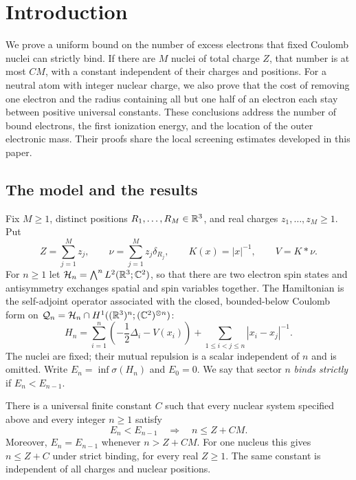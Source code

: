 \section{Introduction}\label{sec:introduction}

We prove a uniform bound on the number of excess electrons that fixed
Coulomb nuclei can strictly bind. If there are $M$ nuclei of total charge
$Z$, that number is at most $CM$, with a constant independent of their
charges and positions. For a neutral atom with integer nuclear charge, we
also prove that the cost of removing one electron and the radius containing
all but one half of an electron each stay between positive universal
constants. These conclusions address the number of bound electrons, the
first ionization energy, and the location of the outer electronic mass.
Their proofs share the local screening estimates developed in this paper.

\subsection{The model and the results}

Fix $M\ge1$, distinct positions $R_1,\ldots,R_M\in\mathbb R^3$, and real
charges $z_1,\ldots,z_M\ge1$. Put
\[
 Z=\sum_{j=1}^M z_j,\qquad \nu=\sum_{j=1}^M z_j\delta_{R_j},
 \qquad K(x)=|x|^{-1},\qquad V=K*\nu.
\]
For $n\ge1$ let $\mathcal H_n=\bigwedge^nL^2(\mathbb R^3;\mathbb C^2)$, so that
there are two electron spin states and antisymmetry exchanges spatial and
spin variables together. The Hamiltonian is the self-adjoint operator
associated with the closed, bounded-below Coulomb form on
$\mathcal Q_n=\mathcal H_n\cap H^1((\mathbb R^3)^n;(\mathbb C^2)^{\otimes n})$:
\begin{equation}\label{eq:hamiltonian}
 H_n=\sum_{i=1}^n\left(-\frac12\Delta_i-V(x_i)\right)
       +\sum_{1\le i<j\le n}|x_i-x_j|^{-1}.
\end{equation}
The nuclei are fixed; their mutual repulsion is a scalar independent of
$n$ and is omitted. Write $E_n=\inf\sigma(H_n)$ and $E_0=0$.
We say that sector $n$ \emph{binds strictly} if $E_n<E_{n-1}$.

\begin{theorem}\label{thm:main}
There is a universal finite constant $C$ such that every nuclear system
specified above and every integer $n\ge1$ satisfy
\[
 E_n<E_{n-1}\quad\Longrightarrow\quad n\le Z+CM.
\]
Moreover, $E_n=E_{n-1}$ whenever $n>Z+CM$. For one nucleus this gives
$n\le Z+C$ under strict binding, for every real $Z\ge1$.
The same constant is independent of all charges and nuclear positions.
\end{theorem}


